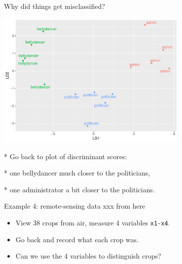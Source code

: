\documentclass[ignorenonframetext,]{beamer}
\begin{document}
\begin{frame}{Why did things get misclassified?}
\protect\hypertarget{why-did-things-get-misclassified}{}

\begin{minipage}[t]{0.7\linewidth}

\includegraphics[width=0.7\textwidth]{nesta}

       
\end{minipage}
\begin{minipage}[t]{0.28\linewidth}


* Go back to plot of discriminant scores:

* one bellydancer much closer to the politicians,

* one administrator a bit closer to the politicians.

\end{minipage}

\end{frame}

\begin{frame}[fragile]{Example 4: remote-sensing data xxx from here}
\protect\hypertarget{example-4-remote-sensing-data-xxx-from-here}{}

\begin{itemize}
\item
  View 38 crops from air, measure 4 variables \texttt{x1-x4}.
\item
  Go back and record what each crop was.
\item
  Can we use the 4 variables to distinguish crops?
\end{itemize}

\end{frame}
\end{document}
